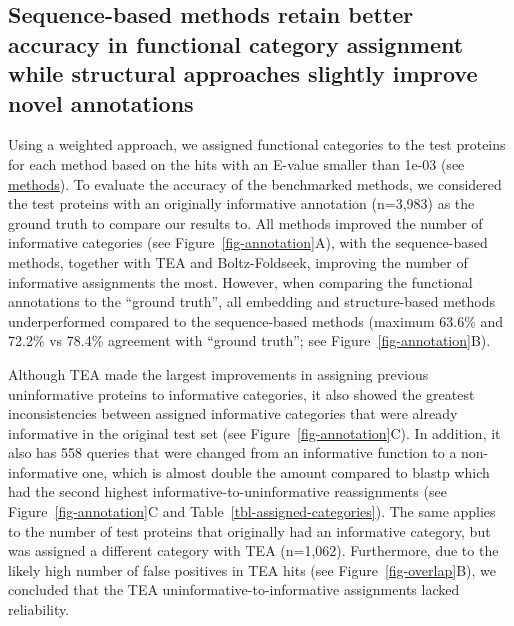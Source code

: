 \documentclass[
  sn-nature,
]{sn-jnl}
\begin{document}
\subsection{Sequence-based methods retain better accuracy in functional
category assignment while structural approaches slightly improve novel
annotations}\label{sequence-based-methods-retain-better-accuracy-in-functional-category-assignment-while-structural-approaches-slightly-improve-novel-annotations}

Using a weighted approach, we assigned functional categories to the test
proteins for each method based on the hits with an E-value smaller than
1e-03 (see \hyperref[functional-category-assignment]{methods}). To
evaluate the accuracy of the benchmarked methods, we considered the test
proteins with an originally informative annotation (n=3,983) as the
ground truth to compare our results to. All methods improved the number
of informative categories (see Figure~\ref{fig-annotation}A), with the
sequence-based methods, together with TEA and Boltz-Foldseek, improving
the number of informative assignments the most. However, when comparing
the functional annotations to the ``ground truth'', all embedding and
structure-based methods underperformed compared to the sequence-based
methods (maximum 63.6\% and 72.2\% vs 78.4\% agreement with ``ground
truth''; see Figure~\ref{fig-annotation}B).

Although TEA made the largest improvements in assigning previous
uninformative proteins to informative categories, it also showed the
greatest inconsistencies between assigned informative categories that
were already informative in the original test set (see
Figure~\ref{fig-annotation}C). In addition, it also has 558 queries that
were changed from an informative function to a non-informative one,
which is almost double the amount compared to blastp which had the
second highest informative-to-uninformative reassignments (see
Figure~\ref{fig-annotation}C and Table~\ref{tbl-assigned-categories}).
The same applies to the number of test proteins that originally had an
informative category, but was assigned a different category with TEA
(n=1,062). Furthermore, due to the likely high number of false positives
in TEA hits (see Figure~\ref{fig-overlap}B), we concluded that the TEA
uninformative-to-informative assignments lacked reliability.
\end{document}
